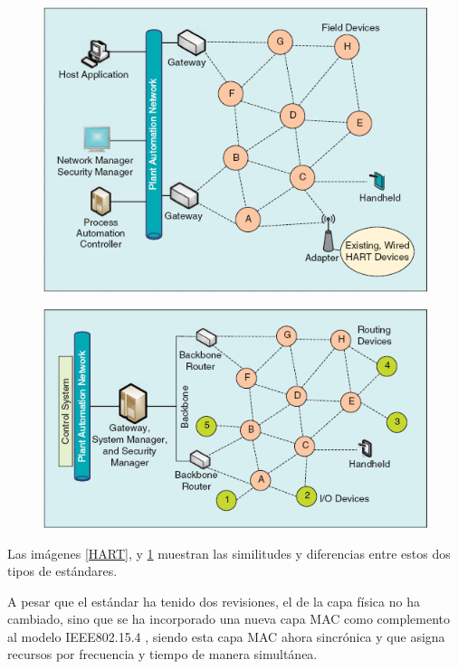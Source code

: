\begin{figure}
\centering
\graphicspath{ {imagenes/} }
\begin{minipage}{.5\textwidth}
  \centering
  \includegraphics[width=.9\linewidth]{HART.png}
  \label{HART}
\end{minipage}%
\begin{minipage}{.5\textwidth}
  \centering
  \includegraphics[width=.9\linewidth]{ISA100.png}
  \label{ISA100}
\end{minipage}
\end{figure}

Las imágenes \ref{HART}, y \ref{ISA100} muestran las similitudes y diferencias entre estos dos tipos de estándares.\cite{petersen2011wirelesshart}




A pesar que el estándar ha tenido dos revisiones, el de la capa física no ha cambiado, sino que se ha incorporado una nueva capa MAC como complemento al modelo IEEE802.15.4 \cite{RFC7554}, siendo esta capa MAC ahora sincrónica y que asigna recursos por frecuencia y tiempo de manera simultánea. \cite{watteyne2015using}

